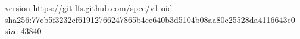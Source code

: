 version https://git-lfs.github.com/spec/v1
oid sha256:77cb5f3232cf61912766247865b4ce640b3d5104b08aa80c25528da4116643c0
size 43840
